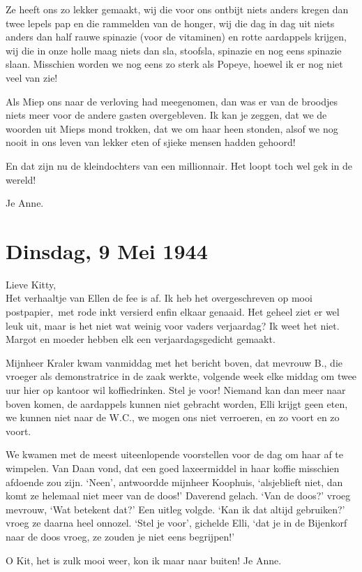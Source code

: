 \documentclass{book}
\begin{document}
Ze heeft ons zo lekker gemaakt, wij die voor ons ontbijt niets anders kregen dan
twee lepels pap en die rammelden van de honger, wij die dag in dag uit niets
anders dan half rauwe spinazie (voor de vitaminen) en rotte aardappels krijgen,
wij die in onze holle maag niets dan sla, stoofsla, spinazie en nog eens
spinazie slaan. Misschien worden we nog eens zo sterk als Popeye, hoewel ik er
nog niet veel van zie!

Als Miep ons naar de verloving had meegenomen, dan was er van de broodjes niets
meer voor de andere gasten overgebleven. Ik kan je zeggen, dat we de woorden uit
Mieps mond trokken, dat we om haar heen stonden, alsof we nog nooit in ons leven
van lekker eten of sjieke mensen hadden gehoord!

En dat zijn nu de kleindochters van een millionnair. Het loopt toch wel gek in
de wereld!

Je Anne.

\section*{Dinsdag, 9 Mei 1944}

Lieve Kitty,\\
Het verhaaltje van Ellen de fee is af. Ik heb het overgeschreven
op mooi postpapier,~met rode inkt versierd enfin elkaar genaaid. Het geheel ziet
er wel leuk uit, maar is het niet wat weinig voor vaders verjaardag? Ik weet het
niet. Margot en moeder hebben elk een verjaardagsgedicht gemaakt.

Mijnheer Kraler kwam vanmiddag met het bericht boven, dat mevrouw B., die
vroeger als demonstratrice in de zaak werkte, volgende week elke middag om twee
uur hier op kantoor wil koffiedrinken. Stel je voor!  Niemand kan dan meer naar
boven komen, de aardappels kunnen niet gebracht worden, Elli krijgt geen eten,
we kunnen niet naar de W.C., we mogen ons niet verroeren, en zo voort en zo
voort.

We kwamen met de meest uiteenlopende voorstellen voor de dag om haar af te
wimpelen. Van Daan vond, dat een goed laxeermiddel in haar koffie misschien
afdoende zou zijn. `Neen', antwoordde mijnheer Koophuis, `alsjeblieft niet, dan
komt ze helemaal niet meer van de doos!' Daverend gelach. `Van de doos?' vroeg
mevrouw, `Wat betekent dat?' Een uitleg volgde. `Kan ik dat altijd gebruiken?'
vroeg ze daarna heel onnozel.  `Stel je voor', gichelde Elli, `dat je in de
Bijenkorf naar de doos vroeg, ze zouden je niet eens begrijpen!'

O Kit, het is zulk mooi weer, kon ik maar naar buiten! Je Anne.
\end{document}
